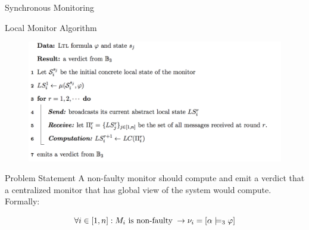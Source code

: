 \begin{frame}{Synchronous Monitoring}

\begin{block}{Local Monitor Algorithm}

\begin{figure}
 \centering
 \includegraphics[scale=.3, angle=-360]{figures/synchalgo}
 \end{figure}
 
\begin{block}{Problem Statement}
A non-faulty monitor should compute and emit a verdict that a centralized monitor that has global view of the system would compute. Formally:

$$\forall i \in [1, n] : M_i~ \text{is non-faulty} \; \rightarrow \nu_i 
= [\alpha \models_3 \varphi]$$ 

\end{block}

\end{block}

 \end{frame}








